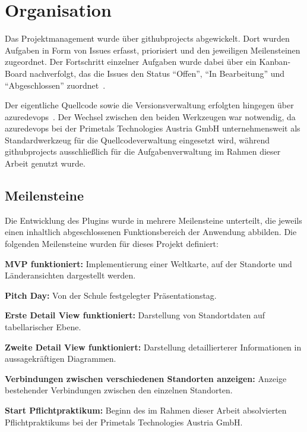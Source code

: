 \section{Organisation}
\label{sec:organisation}

Das Projektmanagement wurde über \gls{githubprojects} abgewickelt. Dort wurden Aufgaben in
Form von Issues erfasst, priorisiert und den jeweiligen Meilensteinen zugeordnet. Der
Fortschritt einzelner Aufgaben wurde dabei über ein Kanban-Board nachverfolgt, das die
Issues den Status \enquote{Offen}, \enquote{In Bearbeitung} und \enquote{Abgeschlossen}
zuordnet~\cite{github2026projects}.

Der eigentliche Quellcode sowie die Versionsverwaltung erfolgten hingegen über
\gls{azuredevops}~\cite{microsoft2026azuredevops}. Der Wechsel zwischen den beiden
Werkzeugen war notwendig, da \gls{azuredevops} bei der Primetals Technologies Austria GmbH
unternehmensweit als Standardwerkzeug für die Quellcodeverwaltung eingesetzt wird, während
\gls{githubprojects} ausschließlich für die Aufgabenverwaltung im Rahmen dieser Arbeit
genutzt wurde.

\subsection{Meilensteine}
\label{subsec:milestones}

Die Entwicklung des Plugins wurde in mehrere Meilensteine unterteilt, die jeweils einen
inhaltlich abgeschlossenen Funktionsbereich der Anwendung abbilden. Die folgenden
Meilensteine wurden für dieses Projekt definiert:

\begin{compactitem}
    \item \textbf{MVP funktioniert:}
    Implementierung einer Weltkarte, auf der Standorte und Länderansichten dargestellt werden.
    \item \textbf{Pitch Day:}
    Von der Schule festgelegter Präsentationstag.
    \item \textbf{Erste Detail View funktioniert:}
    Darstellung von Standortdaten auf tabellarischer Ebene.
    \item \textbf{Zweite Detail View funktioniert:}
    Darstellung detaillierterer Informationen in aussagekräftigen Diagrammen.
    \item \textbf{Verbindungen zwischen verschiedenen Standorten anzeigen:}
    Anzeige bestehender Verbindungen zwischen den einzelnen Standorten.
    \item \textbf{Start Pflichtpraktikum:}
    Beginn des im Rahmen dieser Arbeit absolvierten Pflichtpraktikums bei der Primetals
    Technologies Austria GmbH.
\end{compactitem}

